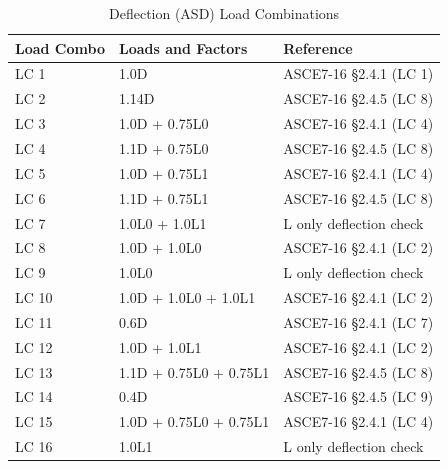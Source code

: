 \documentclass[12pt, fleqn]{article}
\begin{document}
\begin{table}[H]
\caption{Deflection (ASD) Load Combinations}
\centering
\begin{tabular}{l l l}
\hline
Load Combo & Loads and Factors & Reference\\
\hline
LC 1 & 1.0D & ASCE7-16 \S2.4.1 (LC 1)\\
LC 2 & 1.14D & ASCE7-16 \S2.4.5 (LC 8)\\
LC 3 & 1.0D + 0.75L0 & ASCE7-16 \S2.4.1 (LC 4)\\
LC 4 & 1.1D + 0.75L0 & ASCE7-16 \S2.4.5 (LC 8)\\
LC 5 & 1.0D + 0.75L1 & ASCE7-16 \S2.4.1 (LC 4)\\
LC 6 & 1.1D + 0.75L1 & ASCE7-16 \S2.4.5 (LC 8)\\
LC 7 & 1.0L0 + 1.0L1 & L only deflection check\\
LC 8 & 1.0D + 1.0L0 & ASCE7-16 \S2.4.1 (LC 2)\\
LC 9 & 1.0L0 & L only deflection check\\
LC 10 & 1.0D + 1.0L0 + 1.0L1 & ASCE7-16 \S2.4.1 (LC 2)\\
LC 11 & 0.6D & ASCE7-16 \S2.4.1 (LC 7)\\
LC 12 & 1.0D + 1.0L1 & ASCE7-16 \S2.4.1 (LC 2)\\
LC 13 & 1.1D + 0.75L0 + 0.75L1 & ASCE7-16 \S2.4.5 (LC 8)\\
LC 14 & 0.4D & ASCE7-16 \S2.4.5 (LC 9)\\
LC 15 & 1.0D + 0.75L0 + 0.75L1 & ASCE7-16 \S2.4.1 (LC 4)\\
LC 16 & 1.0L1 & L only deflection check\\
\hline
\end{tabular}
\end{table}
\end{document}
